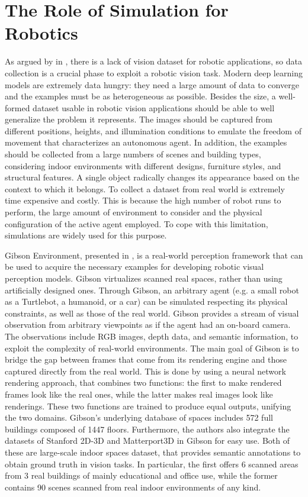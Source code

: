  
 \section{The Role of Simulation for Robotics}
 
 As argued by \citeauthor{surveydeeplimits} in \cite{surveydeeplimits}, there is a lack of vision dataset for robotic applications, so data collection is a crucial phase to exploit a robotic vision task. Modern deep learning models are extremely data hungry: they need a large amount of data to converge and the examples must be as heterogeneous as possible. Besides the size, a well-formed dataset usable in robotic vision applications should be able to well generalize the problem it represents. The images should be captured from different positions, heights, and illumination conditions to emulate the freedom of movement that characterizes an autonomous agent. In addition, the examples should be collected from a large numbers of scenes and building types, considering indoor environments with different designs, furniture styles, and structural features. A single object radically changes its appearance based on the context to which it belongs. To collect a dataset from real world is extremely time expensive and costly. This is because the high number of robot runs to perform, the large amount of environment to consider and the physical configuration of the active agent employed. To cope with this limitation, simulations are widely used for this purpose. 
 
 Gibson Environment, presented in \cite{gibson}, is a real-world perception framework that can be used to acquire the necessary examples for developing robotic visual perception models. Gibson virtualizes scanned real spaces, rather than using artificially designed ones. Through Gibson, an arbitrary agent (e.g. a small robot as a Turtlebot, a humanoid, or a car) can be simulated respecting its physical constraints, as well as those of the real world. Gibson provides a stream of visual observation from arbitrary viewpoints as if the agent had an on-board camera. The observations include RGB images, depth data, and semantic information, to exploit the complexity of real-world environments. The main goal of Gibson is to bridge the gap between frames that come from its rendering engine and those captured directly from the real world. This is done by using a neural network rendering approach, that combines two functions: the first to make rendered frames look like the real ones, while the latter makes real images look like renderings. These two functions are trained to produce equal outputs, unifying the two domains. Gibson’s underlying database of spaces includes 572 full buildings composed of 1447 floors. Furthermore, the authors also integrate the datasets of Stanford 2D-3D \cite{stanford2d3d} and Matterport3D \cite{matterport} in Gibson for easy use. Both of these are large-scale indoor spaces dataset, that provides semantic annotations to obtain ground truth in vision tasks. In particular, the first offers 6 scanned areas from 3 real buildings of mainly educational and office use, while the former contains 90 scenes scanned from real indoor environments of any kind.
 
